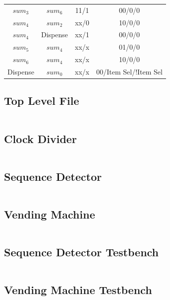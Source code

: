\documentclass[12pt]{article}
\begin{document}
\begin{center}
\begin{tabular}{c c c c}
    $sum_3$     & $sum_6$   & 11/1                            & 00/0/0                           \\
    $sum_4$     & $sum_2$   & xx/0                            & 10/0/0                           \\
    $sum_4$     & Dispense  & xx/1                            & 00/0/0                           \\
    $sum_5$     & $sum_4$   & xx/x                            & 01/0/0                           \\
    $sum_6$     & $sum_4$   & xx/x                            & 10/0/0                           \\
    Dispense    & $sum_0$   & xx/x                            & 00/Item Sel/!Item Sel            \\
    \bottomrule
  \end{tabular}
\end{center}
\pagebreak

\subsection{Top Level File}
\inputminted{vhdl}{../src/Lab2_top.vhd}

\pagebreak
\subsection{Clock Divider}
\inputminted{vhdl}{../src/ClockDivider.vhd}

\pagebreak
\subsection{Sequence Detector}
\inputminted{vhdl}{../src/SequenceDetector.vhd}

\pagebreak
\subsection{Vending Machine}
\inputminted{vhdl}{../src/VendingMachine.vhd}

\pagebreak
\subsection{Sequence Detector Testbench}
\inputminted{vhdl}{../test/SequenceDetector_tb.vhd}

\pagebreak
\subsection{Vending Machine Testbench}
\inputminted{vhdl}{../test/VendingMachine_tb.vhd}
\end{document}
